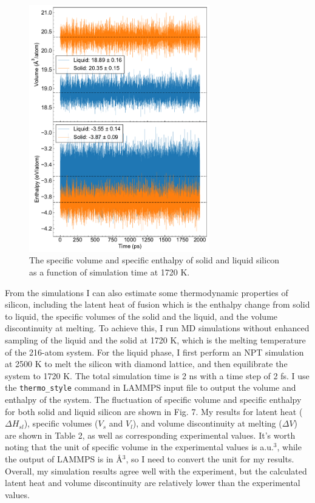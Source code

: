 \documentclass{article}
\begin{document}
\begin{figure}[h!]
    \centering
    \includegraphics[width=0.7\textwidth]{./plot/props.pdf}
    \caption{The specific volume and specific enthalpy of solid and liquid silicon as a function of simulation time at 1720 K.}
\end{figure}

From the simulations I can also estimate some thermodynamic properties of silicon, including the latent heat of fusion which is the enthalpy change from solid to liquid, the specific volumes of the solid and the liquid, and the volume discontinuity at melting. To achieve this, I run MD simulations without enhanced sampling of the liquid and the solid at 1720 K, which is the melting temperature of the 216-atom system. For the liquid phase, I first perform an NPT simulation at 2500 K to melt the silicon with diamond lattice, and then equilibrate the system to 1720 K. The total simulation time is 2 ns with a time step of 2 fs. I use the \verb|thermo_style| command in LAMMPS input file to output the volume and enthalpy of the system. The fluctuation of specific volume and specific enthalpy for both solid and liquid silicon are shown in Fig. 7. My results for latent heat ($\Delta H_{sl}$), specific volumes ($V_s$ and $V_l$), and volume discontinuity at melting ($\Delta V$) are shown in Table 2, as well as corresponding experimental values. It's worth noting that the unit of specific volume in the experimental values is a.u.$^3$, while the output of LAMMPS is in \AA$^3$, so I need to convert the unit for my results. Overall, my simulation results agree well with the experiment, but the calculated latent heat and volume discontinuity are relatively lower than the experimental values.
\end{document}
